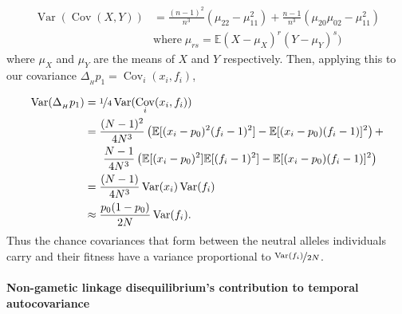 \documentclass[11pt]{article}
\newcommand{\E}{\mathbb{E}}
\DeclareMathOperator{\var}{Var}
\DeclareMathOperator{\cov}{Cov}
\begin{document}
\begin{align}
  \var(\cov(X, Y)) &= \frac{(n-1)^2}{n^3} (\mu_{22} - \mu_{11}^2) + \frac{n-1}{n^3} (\mu_{20}\mu_{02} - \mu_{11}^2)  \\
                   &\text{where} \; \mu_{rs} = \E(X-\mu_X)^r(Y-\mu_Y)^s)
\end{align}
%
where $\mu_X$ and $\mu_Y$ are the means of $X$ and $Y$ respectively.  Then,
applying this to our covariance $\Delta_{_H} p_1 = \cov_i(x_i, f_i)$,

\begin{align}
  \label{eq:strength-assoc}
  \var(\Delta_{_H} p_1) &= \nicefrac{1}{4}\var(\cov_i(x_i, f_i)) \nonumber \\
                     &= \frac{(N-1)^2}{4N^3} \left(\E[(x_i - p_0)^2 (f_i - 1)^2] - \E[(x_i - p_0) (f_i - 1)]^2 \right)+ \nonumber \\
                     &\;\;\;\;\;\; \frac{N-1}{4N^3} \left(\E[(x_i - p_0)^2] \E[(f_i - 1)^2] - \E[(x_i -p_0)(f_i-1)]^2\right) \nonumber \\
                     &= \frac{(N-1)}{4N^3} \var(x_i) \var(f_i) \nonumber \\
                     &\approx \frac{p_0(1-p_0) }{2N} \var(f_i).
\end{align}
%
Thus the chance covariances that form between the neutral alleles individuals
carry and their fitness have a variance proportional to
$\nicefrac{\var(f_i)}{2N}$. 

\paragraph{Non-gametic linkage disequilibrium's contribution to temporal autocovariance}
\label{ap:non-gametic}
\end{document}
